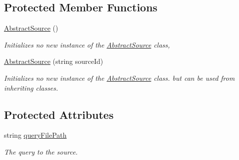 \subsection*{Protected Member Functions}
\begin{DoxyCompactItemize}
\item 
\hyperlink{class_a_rdev_kit_1_1_model_1_1_project_1_1_abstract_source_afbfcad1056b3776f35bdd1b09541ae28}{Abstract\-Source} ()
\begin{DoxyCompactList}\small\item\em Initializes no new instance of the \hyperlink{class_a_rdev_kit_1_1_model_1_1_project_1_1_abstract_source}{Abstract\-Source} class, \end{DoxyCompactList}\item 
\hyperlink{class_a_rdev_kit_1_1_model_1_1_project_1_1_abstract_source_a675e2b01328010a1c6d690e07ba04593}{Abstract\-Source} (string source\-Id)
\begin{DoxyCompactList}\small\item\em Initializes no new instance of the \hyperlink{class_a_rdev_kit_1_1_model_1_1_project_1_1_abstract_source}{Abstract\-Source} class. but can be used from inheriting classes. \end{DoxyCompactList}\end{DoxyCompactItemize}
\subsection*{Protected Attributes}
\begin{DoxyCompactItemize}
\item 
string \hyperlink{class_a_rdev_kit_1_1_model_1_1_project_1_1_abstract_source_abc3b4344725b8e3ae380f1922b59cf53}{query\-File\-Path}
\begin{DoxyCompactList}\small\item\em The query to the source. \end{DoxyCompactList}\end{DoxyCompactItemize}
